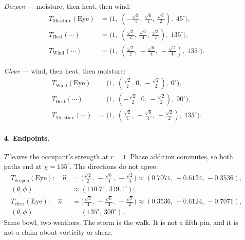 \documentclass[12pt, a4paper]{article}
\begin{document}
\emph{Deepen} --- moisture, then heat, then wind:
\begin{align*}
T_{\mathrm{Moisture}}(\mathrm{Eye})
&= \bigl(1,\;(-\tfrac{\sqrt{2}}{4},\,\tfrac{\sqrt{6}}{4},\,\tfrac{\sqrt{2}}{2}),\;45^\circ\bigr),\\
T_{\mathrm{Heat}}(\cdots)
&= \bigl(1,\;(\tfrac{\sqrt{2}}{2},\,\tfrac{\sqrt{6}}{4},\,\tfrac{\sqrt{2}}{4}),\;135^\circ\bigr),\\
T_{\mathrm{Wind}}(\cdots)
&= \bigl(1,\;(\tfrac{\sqrt{2}}{2},\,-\tfrac{\sqrt{6}}{4},\,-\tfrac{\sqrt{2}}{4}),\;135^\circ\bigr).
\end{align*}

\emph{Clear} --- wind, then heat, then moisture:
\begin{align*}
T_{\mathrm{Wind}}(\mathrm{Eye})
&= \bigl(1,\;(\tfrac{\sqrt{2}}{2},\,0,\,-\tfrac{\sqrt{2}}{2}),\;0^\circ\bigr),\\
T_{\mathrm{Heat}}(\cdots)
&= \bigl(1,\;(-\tfrac{\sqrt{2}}{2},\,0,\,-\tfrac{\sqrt{2}}{2}),\;90^\circ\bigr),\\
T_{\mathrm{Moisture}}(\cdots)
&= \bigl(1,\;(\tfrac{\sqrt{2}}{4},\,-\tfrac{\sqrt{6}}{4},\,-\tfrac{\sqrt{2}}{2}),\;135^\circ\bigr).
\end{align*}

\paragraph{4. Endpoints.}
$T$ leaves the occupant's strength at $r=1$. Phase addition commutes, so
both paths end at $\chi=135^\circ$. The directions do not agree:
\begin{align*}
T_{\mathrm{deepen}}(\mathrm{Eye}):
\quad
\hat n
&= \bigl(\tfrac{\sqrt{2}}{2},\,-\tfrac{\sqrt{6}}{4},\,-\tfrac{\sqrt{2}}{4}\bigr)
\approx (0.7071,\,-0.6124,\,-0.3536),\\
(\theta,\phi)&\approx(110.7^\circ,\,319.1^\circ);\\[0.4em]
T_{\mathrm{clear}}(\mathrm{Eye}):
\quad
\hat n
&= \bigl(\tfrac{\sqrt{2}}{4},\,-\tfrac{\sqrt{6}}{4},\,-\tfrac{\sqrt{2}}{2}\bigr)
\approx (0.3536,\,-0.6124,\,-0.7071),\\
(\theta,\phi)&=(135^\circ,\,300^\circ).
\end{align*}
Same bowl, two weathers. The storm is the walk. It is not a fifth pin,
and it is not a claim about vorticity or shear.
\end{document}
